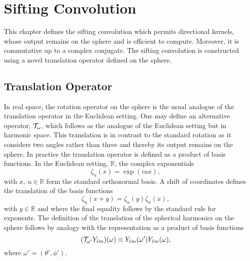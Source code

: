 

\section{Sifting Convolution}\label{sec:chapter3_sifting_convolution}

This chapter defines the sifting convolution which permits directional kernels, whose output remains on the sphere and is efficient to compute.
Moreover, it is commutative up to a complex conjugate.
The sifting convolution is constructed using a novel translation operator defined on the sphere.

\subsection{Translation Operator}\label{sec:chapter3_translation_operator}

In real space, the rotation operator on the sphere is the usual analogue of the translation operator in the Euclidean setting.
One may define an alternative operator, \(\translation{\omega}\), which follows as the analogue of the Euclidean setting but in harmonic space.
This translation is in contrast to the standard rotation as it considers two angles rather than three and thereby its output remains on the sphere.
In practice the translation operator is defined as a product of basis functions.
In the Euclidean setting, \eg{} \(\mathbb{R}\), the complex exponentials
%
\begin{equation}\label{eq:chapter3_complex_exponentials}
	\zeta_{u}(x)
	= \exp(i u x),
\end{equation}
%
with \(x,\ u \in \mathbb{R}\) form the standard orthonormal basis.
A shift of coordinates defines the translation of the basis functions
%
\begin{equation}\label{eq:chapter3_exponentials_shift}
	\zeta_{u}(x + y)
	= \zeta_{u}(y) \zeta_{u}(x),
\end{equation}
%
with \(y \in \mathbb{R}\) and where the final equality follows by the standard rule for exponents.
The definition of the translation of the spherical harmonics on the sphere follows by analogy with the representation as a product of basis functions
%
\begin{equation}\label{eq:chapter3_translation_basis_functions}
	\pixel{(\translation{\omega'}\harmonic{Y})}
	\equiv \pixel[']{\harmonic{Y}} \pixel{\harmonic{Y}},
\end{equation}
%
where \(\omega'=(\theta',\phi')\).

